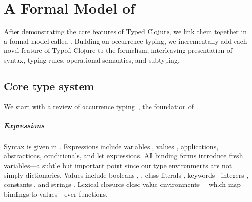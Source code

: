 \chapter{A Formal Model of \lambdatc{}}

\label{sec:formal}

After demonstrating the core features of Typed Clojure, 
we link them together in a formal model called
\lambdatc{}.
%
Building on occurrence typing,
we incrementally add each
novel feature of Typed Clojure to the formalism,
interleaving presentation of syntax, typing rules, operational semantics,
and subtyping.

\section{Core type system}
\label{sec:coretypesystem}

We start with a review of
occurrence typing~\cite{TF10}, the foundation of \lambdatc{}.

\paragraph{Expressions} Syntax is given in . Expressions \e{} 
include variables \x{}, values \val{},
applications, abstractions, conditionals, and let expressions.
All binding forms introduce fresh variables---a subtle but important point since our type environments
are not simply dictionaries.
Values include booleans \bool{}, \nil{}, class literals {\class{}}, keywords \kw{},
integers {\nat{}},
constants {\const{}}, and strings \str{}. Lexical closures {\closure {\openv{}} {\abs {\x{}} {\ty{}} {\e{}}}}
close value environments \openv{}---which map bindings to values---over functions.

